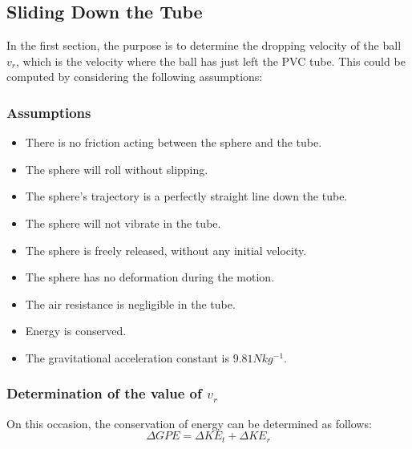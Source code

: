 \documentclass[conference]{IEEEtran}
\begin{document}
    \subsection{Sliding Down the Tube}
        In the first section, the purpose is to determine the dropping velocity of the ball $v_r$, which is the velocity where the ball has just left the PVC tube. This could be computed by considering the following assumptions:
        \subsubsection{Assumptions}
            \begin{itemize}
                \item There is no friction acting between the sphere and the tube.
                \item The sphere will roll without slipping.
                \item The sphere's trajectory is a perfectly straight line down the tube.
                \item The sphere will not vibrate in the tube.
                \item The sphere is freely released, without any initial velocity.
                \item The sphere has no deformation during the motion.
                \item The air resistance is negligible in the tube.
                \item Energy is conserved.
                \item The gravitational acceleration constant is $9.81Nkg^{-1}$.
            \end{itemize}

    
        \subsubsection{Determination of the value of $v_r$}
            On this occasion, the conservation of energy can be determined as follows:
            \begin{equation}
                \Delta GPE = \Delta KE_t + \Delta KE_r \nonumber
            \end{equation}
\end{document}
